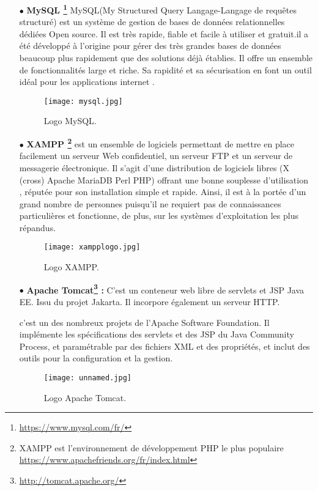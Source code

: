 \begin{itemize}
\item[$\bullet$] \textbf{MySQL \footnote{ \url{https://www.mysql.com/fr/} }} 
MySQL(My Structured Query Langage-Langage de requêtes structuré) est un système de
gestion de bases de données relationnelles dédiées Open source. Il est très rapide, fiable et facile à utiliser et gratuit.il a été développé à l’origine pour gérer des très grandes bases de données beaucoup plus rapidement que des solutions déjà établies. Il offre un ensemble de fonctionnalités large et riche. Sa rapidité et sa sécurisation en font un outil idéal pour les applications internet .\cite{wiki:MySQL} 
\begin{figure}[ht]
	\centering
	\texttt{[image: mysql.jpg]}
	\caption{Logo MySQL.}
	\label{fig:Logo MySQL }
\end{figure}
\FloatBarrier
\medskip

   \item[$\bullet$] \textbf{ XAMPP \footnote{XAMPP est l'environnement de développement PHP le plus populaire \url{https://www.apachefriends.org/fr/index.html} }} est un ensemble de logiciels permettant de mettre
    en place facilement un serveur Web
    confidentiel, un serveur FTP et un serveur de messagerie
    électronique. Il s’agit d’une distribution de logiciels libres (X
    (cross) Apache MariaDB Perl PHP) offrant une bonne
    souplesse d'utilisation , réputée pour son installation
    simple et rapide. Ainsi, il est à la portée d’un grand nombre de
    personnes puisqu'il ne requiert pas de connaissances
    particulières et fonctionne, de plus, sur les systèmes
    d'exploitation les plus répandus.
 \cite{wiki:XAMPP} 
    \begin{figure}[ht]
    	\centering
    	\texttt{[image: xampplogo.jpg]}
    	\caption{Logo XAMPP.}
    	\label{fig:xampp logo}
    \end{figure}
    \FloatBarrier
    
        \medskip
    
   \item[$\bullet$] \textbf{Apache Tomcat\footnote{\url{http://tomcat.apache.org/}} :} C'est un conteneur web libre de servlets et JSP Java EE. Issu du projet Jakarta. Il incorpore également un serveur HTTP\cite{wiki:tomcat}.
    
 c’est un des nombreux projets de l’Apache Software Foundation. Il implémente les spécifications des servlets et des JSP du Java Community Process, et paramétrable par des fichiers XML et des propriétés, et inclut des outils pour la configuration et la gestion.
 
  \begin{figure}[ht]
 	\centering
 	\texttt{[image: unnamed.jpg]}
 	\caption{Logo Apache Tomcat.}
 	\label{fig:Apache Tomcat}
 \end{figure}
 \FloatBarrier
\medskip
\end{itemize}


